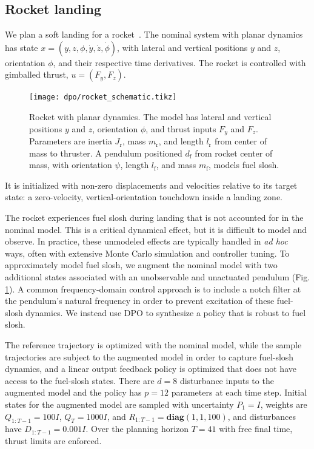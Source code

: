 \subsection{Rocket landing}
We plan a soft landing for a rocket~\cite{meditch1964problem}. The nominal system with planar dynamics has state $x = (y,z,\phi,\dot{y},\dot{z},\dot{\phi})$, with lateral and vertical positions $y$ and $z$, orientation $\phi$, and their respective time derivatives. The rocket is controlled with gimballed thrust, $u = (F_{y},F_{z})$. 

\begin{figure}[H]
	\centering
	\texttt{[image: dpo/rocket\_schematic.tikz]}
	\caption[Planar rocket model]{Rocket with planar dynamics. The model has lateral and vertical positions $y$ and $z$, orientation $\phi$, and thrust inputs $F_y$ and $F_z$. Parameters are inertia $J_{\mathrm{r}}$, mass $m_{\mathrm{r}}$, and length  $l_{\mathrm{r}}$ from center of mass to thruster. A pendulum positioned $d_{\mathrm{f}}$ from rocket center of mass, with orientation $\psi$, length $l_{\mathrm{f}}$, and mass $m_{\mathrm{f}}$, models fuel slosh.}
	\label{dpo_rocket_model}
\end{figure}

It is initialized with non-zero displacements and velocities relative to its target state: a zero-velocity, vertical-orientation touchdown inside a landing zone.

The rocket experiences fuel slosh during landing that is not accounted for in the nominal model. This is a critical dynamical effect, but it is difficult to model and observe. In practice, these unmodeled effects are typically handled in \textit{ad hoc} ways, often with extensive Monte Carlo simulation and controller tuning. To approximately model fuel slosh, we augment the nominal model with two additional states associated with an unobservable and unactuated pendulum (Fig. \ref{dpo_rocket_model}). A common frequency-domain control approach is to include a notch filter at the pendulum's natural frequency in order to prevent excitation of these fuel-slosh dynamics. We instead use DPO to synthesize a policy that is robust to fuel slosh.

The reference trajectory is optimized with the nominal model, while the sample trajectories are subject to the augmented model in order to capture fuel-slosh dynamics, and a linear output feedback policy is optimized that does not have access to the fuel-slosh states. There are $d = 8$ disturbance inputs to the augmented model and the policy has $p = 12$ parameters at each time step. Initial states for the augmented model are sampled with uncertainty $P_1 = I$, weights are $Q_{1:T-1} = 100I$, $Q_T = 1000I$, and $R_{1:T-1} = \textbf{diag}(1,1,100)$, and disturbances have $D_{1:T-1} = 0.001I$. Over the planning horizon $T = 41$ with free final time, thrust limits are enforced.

